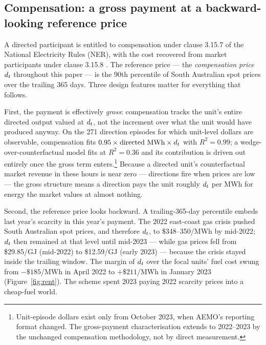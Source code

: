 \subsection{Compensation: a gross payment at a backward-looking reference price}

A directed participant is entitled to compensation under clause 3.15.7 of
the National Electricity Rules (NER), with the cost recovered from market
participants under clause 3.15.8 \citep{AEMC2024_ner}. The reference price --- the
\emph{compensation price} $d_t$ throughout this paper --- is the 90th percentile
of South Australian spot prices over the trailing 365 days. Three design features
matter for everything that follows.

First, the payment is effectively \emph{gross}: compensation tracks the unit's
entire directed output valued at $d_t$, not the increment over what the unit
would have produced anyway. On the 271 direction episodes for which
unit-level dollars are observable, compensation fits
$0.95 \times \text{directed MWh} \times d_t$ with $R^{2}=0.99$; a
wedge-over-counterfactual model fits at $R^{2}=0.36$ and its contribution is
driven out entirely once the gross term enters.\footnote{Unit-episode dollars
exist only from October 2023, when AEMO's reporting format changed. The
gross-payment characterisation extends to 2022--2023 by the unchanged
compensation methodology, not by direct measurement.} Because a directed unit's
counterfactual market revenue in these hours is near zero --- directions fire
when prices are low --- the gross structure means a direction pays the unit
roughly $d_t$ per MWh for energy the market values at almost nothing.

Second, the reference price looks backward. A trailing-365-day percentile
embeds last year's scarcity in this year's payment. The 2022 east-coast gas
crisis pushed South Australian spot prices, and therefore $d_t$, to
\$348--350/MWh by mid-2022; $d_t$ then remained at that level until mid-2023 --- while gas prices fell
from \$29.85/GJ (mid-2022) to \$12.59/GJ (early 2023) --- because the crisis
stayed inside the trailing window. The margin
of $d_t$ over the focal units' fuel cost swung from $-\$185$/MWh in April 2022
to $+\$211$/MWh in January 2023 (Figure~\ref{fig:rent}). The scheme spent 2023
paying 2022 scarcity prices into a cheap-fuel world.

